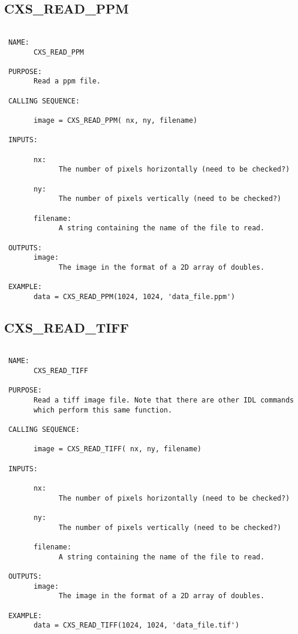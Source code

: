   
 
\subsection{CXS\_READ\_PPM}
\begin{verbatim}

 NAME:
       CXS_READ_PPM

 PURPOSE:
       Read a ppm file.

 CALLING SEQUENCE:

       image = CXS_READ_PPM( nx, ny, filename)

 INPUTS:

       nx:
             The number of pixels horizontally (need to be checked?)

       ny:
             The number of pixels vertically (need to be checked?)

       filename:
             A string containing the name of the file to read.

 OUTPUTS:
       image:
             The image in the format of a 2D array of doubles.

 EXAMPLE:
       data = CXS_READ_PPM(1024, 1024, 'data_file.ppm')

\end{verbatim}






  
 
\subsection{CXS\_READ\_TIFF}
\begin{verbatim}

 NAME:
       CXS_READ_TIFF

 PURPOSE:
       Read a tiff image file. Note that there are other IDL commands
       which perform this same function.

 CALLING SEQUENCE:

       image = CXS_READ_TIFF( nx, ny, filename)

 INPUTS:

       nx:
             The number of pixels horizontally (need to be checked?)

       ny:
             The number of pixels vertically (need to be checked?)

       filename:
             A string containing the name of the file to read.

 OUTPUTS:
       image:
             The image in the format of a 2D array of doubles.

 EXAMPLE:
       data = CXS_READ_TIFF(1024, 1024, 'data_file.tif')

\end{verbatim}






